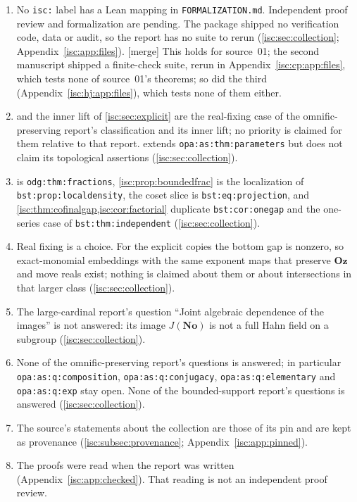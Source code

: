 \documentclass[11pt,letterpaper]{article}
\theoremstyle{definition}
\theoremstyle{remark}
\newcommand{\No}{\mathbf{No}}
\newcommand{\Oz}{\mathbf{Oz}}
\newcommand{\rpath}[1]{\nolinkurl{#1}}%
\newcommand{\lbl}[1]{\nolinkurl{#1}}%
\newcommand{\mtag}{\textup{[merge]}}%
\numberwithin{equation}{section}
\begin{document}
\begin{enumerate}[label=W\arabic*.,leftmargin=2.6em,itemsep=2pt]
\item No \texttt{isc:} label has a Lean mapping in \rpath{FORMALIZATION.md}.
Independent proof review and formalization are pending. The package shipped
no verification code, data or audit, so the report has no suite to rerun
(\cref{isc:sec:collection}; Appendix~\ref{isc:app:files}). \mtag{} This
holds for source~01; the second manuscript shipped a finite-check suite,
rerun in Appendix~\ref{isc:cp:app:files}, which tests none of source~01's
theorems; so did the third (Appendix~\ref{isc:hj:app:files}), which tests
none of them either.
\item {}
and the inner lift of \cref{isc:sec:explicit} are the real-fixing case of
the omnific-preserving report's classification and its inner lift; no
priority is claimed for them relative to that report. 
extends \lbl{opa:as:thm:parameters} but does not claim its topological
assertions (\cref{isc:sec:collection}).
\item {} is \lbl{odg:thm:fractions},
\cref{isc:prop:boundedfrac} is the localization of
\lbl{bst:prop:localdensity}, the coset slice is \lbl{bst:eq:projection},
and \cref{isc:thm:cofinalgap,isc:cor:factorial} duplicate
\lbl{bst:cor:onegap} and the one-series case of \lbl{bst:thm:independent}
(\cref{isc:sec:collection}).
\item Real fixing is a choice. For the explicit copies the bottom gap is
nonzero, so exact-monomial embeddings with the same exponent maps that
preserve $\Oz$ and move reals exist; nothing is claimed about them or about
intersections in that larger class (\cref{isc:sec:collection}).
\item The large-cardinal report's question ``Joint algebraic dependence of
the images'' is not answered: its image $J(\No)$ is not a full Hahn field
on a subgroup (\cref{isc:sec:collection}).
\item None of the omnific-preserving report's questions is answered; in
particular \lbl{opa:as:q:composition}, \lbl{opa:as:q:conjugacy},
\lbl{opa:as:q:elementary} and \lbl{opa:as:q:exp} stay open. None of the
bounded-support report's questions is answered (\cref{isc:sec:collection}).
\item The source's statements about the collection are those of its pin and
are kept as provenance (\cref{isc:subsec:provenance};
Appendix~\ref{isc:app:pinned}).
\item The proofs were read when the report was written
(Appendix~\ref{isc:app:checked}). That reading is not an independent proof
review.
\end{enumerate}
\end{document}

